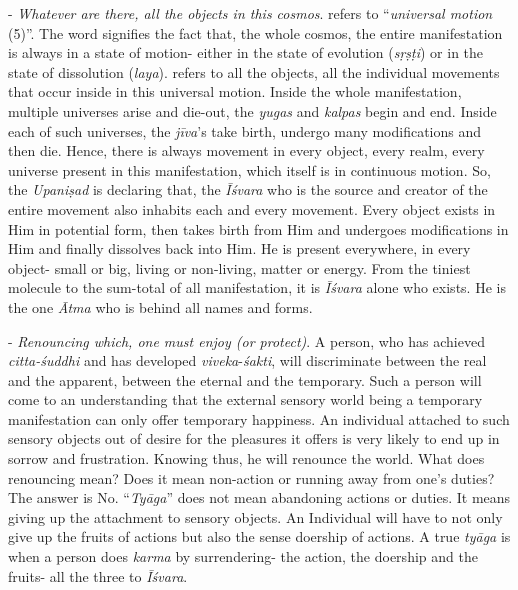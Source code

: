 - \emph{Whatever are there, all the objects in this cosmos}.  refers to ``\emph{universal motion} (5)''. The word signifies the fact that, the whole cosmos, the entire manifestation is always in a state of motion- either in the state of evolution (\emph{sṛṣṭi}) or in the state of dissolution (\emph{laya}).  refers to all the objects, all the individual movements that occur inside in this universal motion. Inside the whole manifestation, multiple universes arise and die-out, the \emph{yugas} and \emph{kalpas} begin and end. Inside each of such universes, the \emph{jīva}'s take birth, undergo many modifications and then die. Hence, there is always movement in every object, every realm, every universe present in this manifestation, which itself is in continuous motion. So, the \emph{Upaniṣad} is declaring that, the \emph{Īśvara} who is the source and creator of the entire movement also inhabits each and every movement. Every object exists in Him in potential form, then takes birth from Him and undergoes modifications in Him and finally dissolves back into Him. He is present everywhere, in every object- small or big, living or non-living, matter or energy. From the tiniest molecule to the sum-total of all manifestation, it is \emph{Īśvara} alone who exists. He is the one \emph{Ātma} who is behind all names and forms.
\vskip 1.1pt

- \emph{Renouncing which, one must enjoy (or protect)}. A person, who has achieved \emph{citta-śuddhi} and has developed \emph{viveka}-\emph{śakti}, will discriminate between the real and the apparent, between the eternal and the temporary. Such a person will come to an understanding that the external sensory world being a temporary manifestation can only offer temporary happiness. An individual attached to such sensory objects out of desire for the pleasures it offers is very likely to end up in sorrow and frustration. Knowing thus, he will renounce the world. What does renouncing mean? Does it mean non-action or running away from one's duties? The answer is No. ``\emph{Tyāga}'' does not mean abandoning actions or duties. It means giving up the attachment to sensory objects. An Individual will have to not only give up the fruits of actions but also the sense doership of actions. A true \emph{tyāga} is when a person does \emph{karma} by surrendering- the action, the doership and the fruits- all the three to \emph{Īśvara}.
\vskip 1.1pt

